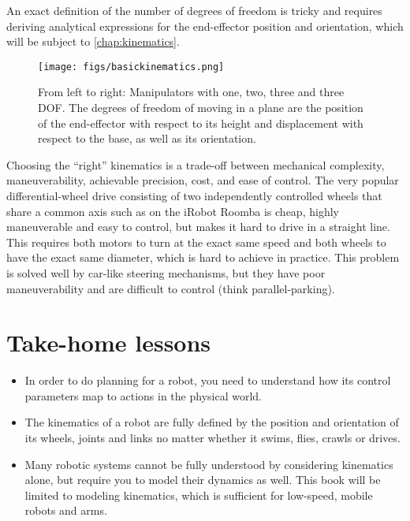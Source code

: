 An exact definition of the number of degrees of freedom is tricky and requires deriving analytical expressions for the end-effector position and orientation, which will be subject to \cref{chap:kinematics}.

\begin{figure}
	\centering
		\texttt{[image: figs/basickinematics.png]}
	\caption{From left to right: Manipulators with one, two, three and three DOF. The degrees of freedom of moving in a plane are the position of the end-effector with respect to its height and displacement with respect to the base, as well as its orientation.}
	\label{fig:basickinematics}
\end{figure}

Choosing the ``right'' kinematics is a trade-off between mechanical complexity, maneuverability, achievable precision, cost, and ease of control. The very popular differential-wheel drive consisting of two independently controlled wheels that share a common axis such as on the iRobot Roomba is cheap, highly maneuverable and easy to control, but makes it hard to drive in a straight line. This requires both motors to turn at the exact same speed and both wheels to have the exact same diameter, which is hard to achieve in practice. This problem is solved well by car-like steering mechanisms, but they have poor maneuverability and are difficult to control (think parallel-parking).


\section*{Take-home lessons}

\begin{itemize}
\item In order to do planning for a robot, you need to understand how its control parameters map to actions in the physical world.
\item The kinematics of a robot are fully defined by the position and orientation of its wheels, joints and links no matter whether it swims, flies, crawls or drives.
\item Many robotic systems cannot be fully understood by considering kinematics alone, but require you to model their dynamics as well. This book will be limited to modeling kinematics, which is sufficient for low-speed, mobile robots and arms.
\end{itemize}


